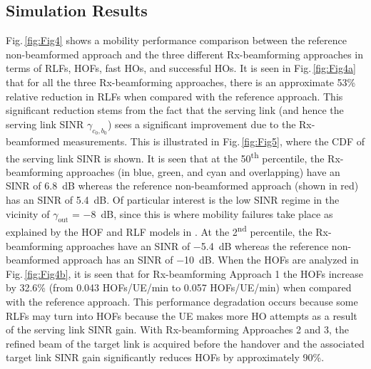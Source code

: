 \documentclass[10pt, conference]{IEEEtran}
\begin{document}
\subsection{Simulation Results} \label{Subsection5.2}
Fig.\,\ref{fig:Fig4} shows a mobility performance comparison between the reference non-beamformed approach and the three different Rx-beamforming approaches in terms of RLFs, HOFs, fast HOs, and successful HOs. It is seen in Fig.\,\ref{fig:Fig4a} that for all the three Rx-beamforming approaches, there is an approximate 53\% relative reduction in RLFs when compared with the reference approach. This significant reduction stems from the fact that the serving link (and hence the serving link SINR $\gamma_{c_0, b_0}$) sees a significant improvement due to the Rx-beamformed measurements. This is illustrated in Fig.\,\ref{fig:Fig5}, where the CDF of the serving link SINR is shown. It is seen that at the 50\textsuperscript{th} percentile, the Rx-beamforming approaches (in blue, green, and cyan and overlapping) have an SINR of \SI{6.8}{dB} whereas the reference non-beamformed approach (shown in red) has an SINR of \SI{5.4}{dB}. Of particular interest is the low SINR regime in the vicinity of $\gamma_\mathrm{out}$ = \SI{-8}{dB}, since this is where mobility failures take place as explained by the HOF and RLF models in . At the 2\textsuperscript{nd} percentile, the Rx-beamforming approaches have an SINR of \SI{-5.4}{dB} whereas the reference non-beamformed approach has an SINR of \SI{-10}{dB}. When the HOFs are analyzed in Fig.\,\ref{fig:Fig4b}, it is seen that for Rx-beamforming Approach 1 the HOFs increase by 32.6\% (from 0.043 HOFs/UE/min to 0.057 HOFs/UE/min) when compared with the reference approach. This performance degradation occurs because some RLFs may turn into HOFs because the UE makes more HO attempts as a result of the serving link SINR gain. With Rx-beamforming Approaches 2 and 3, the refined beam of the target link is acquired before the handover and the associated target link SINR gain significantly reduces HOFs by approximately 90\%. 
\end{document}
